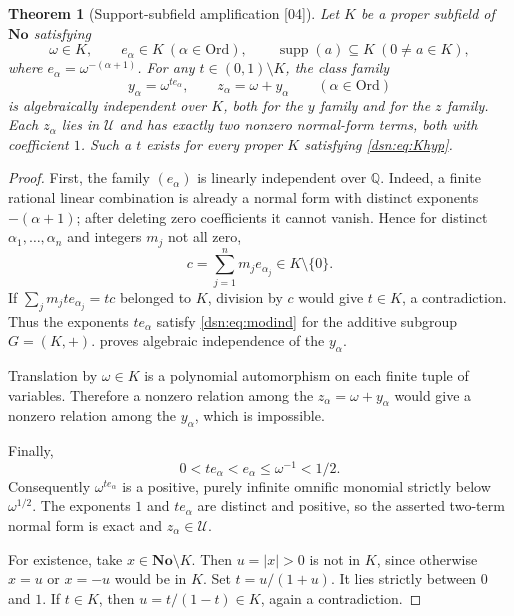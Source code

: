 \documentclass[11pt,a4paper]{article}
\numberwithin{equation}{section}
\newtheorem{theorem}{Theorem}[section]
\theoremstyle{definition}
\theoremstyle{remark}
\newcommand{\No}{\mathbf{No}}
\newcommand{\Ord}{\mathrm{Ord}}
\newcommand{\Q}{\mathbb Q}
\newcommand{\supp}{\operatorname{supp}}
\newcommand{\Cell}{\mathcal U}
\newcommand{\src}[1]{\textup{\textsf{\small[#1]}}}
\begin{document}
\begin{theorem}[Support-subfield amplification \src{04}]\label{dsn:thm:amplify}
Let $K$ be a proper subfield of $\No$ satisfying
\begin{equation}\label{dsn:eq:Khyp}
 \omega\in K,\qquad e_\alpha\in K\ (\alpha\in\Ord),\qquad
 \supp(a)\subseteq K\ (0\ne a\in K),
\end{equation}
where $e_\alpha=\omega^{-(\alpha+1)}$.
For any $t\in(0,1)\setminus K$, the class family
\begin{equation}\label{dsn:eq:indfam}
 y_\alpha=\omega^{t e_\alpha},\qquad
 z_\alpha=\omega+y_\alpha\qquad(\alpha\in\Ord)
\end{equation}
is algebraically independent over $K$, both for the $y$ family and
for the $z$ family. Each $z_\alpha$ lies in $\Cell$ and has exactly
two nonzero normal-form terms, both with coefficient $1$.
Such a $t$ exists for every proper $K$ satisfying \eqref{dsn:eq:Khyp}.
\end{theorem}
\begin{proof}
First, the family $(e_\alpha)$ is linearly independent over $\Q$.
Indeed, a finite rational linear combination is already a normal
form with distinct exponents $-(\alpha+1)$; after deleting zero
coefficients it cannot vanish. Hence for distinct
$\alpha_1,\ldots,\alpha_n$ and integers $m_j$ not all zero,
\[
 c=\sum_{j=1}^n m_j e_{\alpha_j}\in K\setminus\{0\}.
\]
If $\sum_jm_jte_{\alpha_j}=tc$ belonged to $K$, division by $c$
would give $t\in K$, a contradiction. Thus the exponents
$te_\alpha$ satisfy \eqref{dsn:eq:modind} for the additive subgroup
$G=(K,+)$.  proves algebraic independence of
the $y_\alpha$.

Translation by $\omega\in K$ is a polynomial automorphism on each
finite tuple of variables. Therefore a nonzero relation among the
$z_\alpha=\omega+y_\alpha$ would give a nonzero relation among the
$y_\alpha$, which is impossible.

Finally,
\[
 0<te_\alpha<e_\alpha\leq\omega^{-1}<1/2.
\]
Consequently $\omega^{te_\alpha}$ is a positive, purely infinite
omnific monomial strictly below $\omega^{1/2}$. The exponents $1$
and $te_\alpha$ are distinct and positive, so the asserted two-term
normal form is exact and $z_\alpha\in\Cell$.

For existence, take $x\in\No\setminus K$. Then $u=|x|>0$ is not
in $K$, since otherwise $x=u$ or $x=-u$ would be in $K$. Set
$t=u/(1+u)$. It lies strictly between $0$ and $1$. If $t\in K$,
then $u=t/(1-t)\in K$, again a contradiction.
\end{proof}
\end{document}

